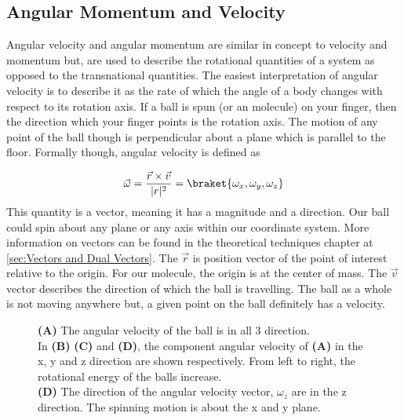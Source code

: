 \documentclass[11pt,a4paper]{book}
\newcommand{\imginput}[1]{} %
\begin{document}
		\subsection{Angular Momentum and Velocity}
			\label{subsec:Angular Momentum and Velocity}		
			Angular velocity and angular momentum are similar in concept to velocity and momentum but, are used to describe the rotational quantities of a system as opposed to the transnational quantities. The easiest interpretation of angular velocity is to describe it as the rate of which the angle of a body changes with respect to its rotation axis. If a ball is spun (or an molecule) on your finger, then the direction which your finger points is the rotation axis. The motion of any point of the ball though is perpendicular about a plane which is parallel to the floor. Formally though, angular velocity is defined as
			
			\begin{equation}
				\label{eq:angular velocity}
				\vec{\omega} = \dfrac{\vec{r} \times \vec{v}}{|r|^2}
				= \braket{\omega_x,\omega_y,\omega_z}
			\end{equation}
			This quantity is a vector, meaning it has a magnitude and a direction. Our ball could spin about any plane or any axis within our coordinate system. More information on vectors can be found in the theoretical techniques chapter at \autoref{sec:Vectors and Dual Vectors}. The $\vec{r}$ is position vector of the point of interest relative to the origin. For our molecule, the origin is at the center of mass. The $\vec{v}$ vector describes the direction of which the ball is travelling. The ball as a whole is not moving anywhere but, a given point on the ball definitely has a velocity.
			
			\begin{figure} [!ht]
				\centering
				\def\svgwidth{\columnwidth}
				\resizebox{16cm}{!}{\imginput{images/angular-velocity-momentum.pdf_tex}}
				\caption{\textbf{(A)} The angular velocity of the ball is in all 3 direction. \\
				In \textbf{(B)} \textbf{(C)} and \textbf{(D)}, the component angular velocity of \textbf{(A)} in the x, y and z direction are shown respectively. From left to right, the rotational energy of the balls increase. \\
				\textbf{(D)} The direction of the angular velocity vector, $\omega_z$ are in the z direction. The spinning motion is about the x and y plane.
					}
				\label{fig:angular-velocity-momentum}
			\end{figure}	
					
\end{document}
